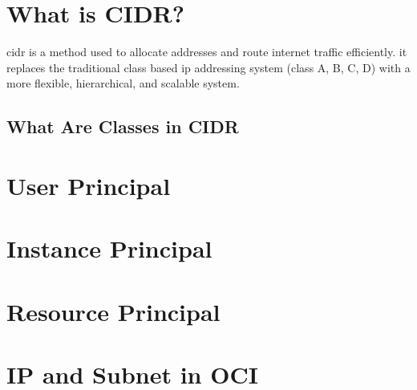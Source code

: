 \documentclass[../main.tex]{subfiles}
\begin{document}
\section{What is CIDR?}
\acrfull{cidr} is a method used to allocate  addresses and route internet traffic efficiently. it replaces the traditional class based \acrshort{ip} addressing system (class A, B, C, D) with a more flexible, hierarchical, and scalable system.
\subsection{What Are Classes in CIDR}
\section{User Principal}
\section{Instance Principal}
\section{Resource Principal}
\section{IP and Subnet in OCI}

\end{document}
